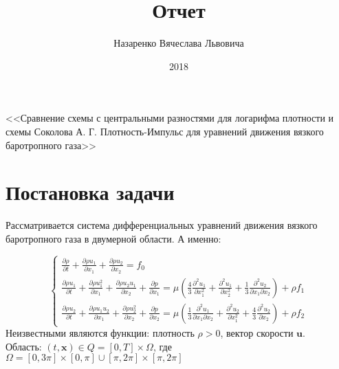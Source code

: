 \documentclass[specialist,subf,href,colorlinks=true,14pt,times,mtpro]{disser}
\newcommand{\pdrv}[2]{\frac{\partial #1}{\partial #2}}
\begin{document}

\title{Отчет}

\topic
{<<Сравнение схемы с центральными разностями для логарифма плотности и схемы 
Соколова А. Г. Плотность-Импульс для уравнений движения вязкого баротропного 
газа>>}

\author{Назаренко Вячеслава Львовича}



\date{2018}
\maketitle

\setcounter{tocdepth}{2}

\tableofcontents
\pagebreak

\section{Постановка задачи}

Рассматривается система дифференциальных уравнений движения вязкого баротропного газа в двумерной области. А именно:

$$
\begin{cases}
\pdrv{\rho}{t} + \pdrv{\rho u_1}{x_1} + \pdrv{\rho u_2}{x_2} = f_0 \\
\pdrv{\rho u_1}{t} + \pdrv{\rho u_1^2}{x_1} + \pdrv{\rho u_2 u_1}{x_2} + \pdrv{p}{x_1} = \mu\left( \frac{4}{3} \pdrv{^2 u_1}{x_1^2} + \pdrv{^2 u_1}{x_2^2} + \frac{1}{3} \pdrv{^2 u_2}{x_1 \partial x_2}\right) + \rho f_1 \\
\pdrv{\rho u_2}{t} + \pdrv{\rho u_1 u_2}{x_1} + \pdrv{\rho u_2^2}{x_2} + \pdrv{p}{x_2} = \mu\left( \frac{1}{3} \pdrv{^2 u_1}{x_1 \partial x_2} + \pdrv{^2 u_2}{x_1^2} + \frac{4}{3} \pdrv{^2 u_2}{x_2}\right) + \rho f_2
\end{cases}
$$
Неизвестными являются функции: плотность $\rho > 0$, вектор скорости $\textbf{u}$. \\
Область: $(t, \textbf{x}) \in Q = [0, T] \times \Omega$, где $\Omega = [0, 3\pi] \times [0, \pi] \cup [\pi, 2\pi] \times [\pi, 2\pi]$
\end{document}
